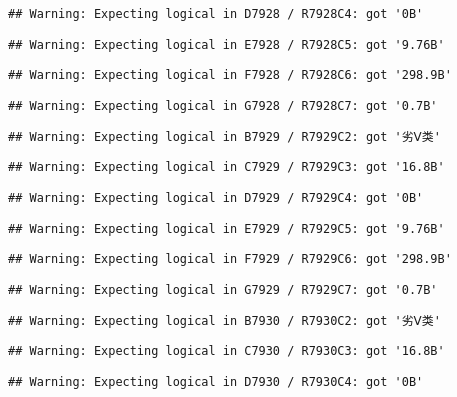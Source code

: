 \documentclass[
]{article}
\begin{document}
\begin{verbatim}
## Warning: Expecting logical in D7928 / R7928C4: got '0B'
\end{verbatim}

\begin{verbatim}
## Warning: Expecting logical in E7928 / R7928C5: got '9.76B'
\end{verbatim}

\begin{verbatim}
## Warning: Expecting logical in F7928 / R7928C6: got '298.9B'
\end{verbatim}

\begin{verbatim}
## Warning: Expecting logical in G7928 / R7928C7: got '0.7B'
\end{verbatim}

\begin{verbatim}
## Warning: Expecting logical in B7929 / R7929C2: got '劣Ⅴ类'
\end{verbatim}

\begin{verbatim}
## Warning: Expecting logical in C7929 / R7929C3: got '16.8B'
\end{verbatim}

\begin{verbatim}
## Warning: Expecting logical in D7929 / R7929C4: got '0B'
\end{verbatim}

\begin{verbatim}
## Warning: Expecting logical in E7929 / R7929C5: got '9.76B'
\end{verbatim}

\begin{verbatim}
## Warning: Expecting logical in F7929 / R7929C6: got '298.9B'
\end{verbatim}

\begin{verbatim}
## Warning: Expecting logical in G7929 / R7929C7: got '0.7B'
\end{verbatim}

\begin{verbatim}
## Warning: Expecting logical in B7930 / R7930C2: got '劣Ⅴ类'
\end{verbatim}

\begin{verbatim}
## Warning: Expecting logical in C7930 / R7930C3: got '16.8B'
\end{verbatim}

\begin{verbatim}
## Warning: Expecting logical in D7930 / R7930C4: got '0B'
\end{verbatim}
\end{document}
